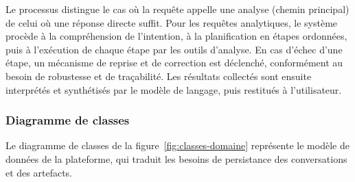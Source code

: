Le processus distingue le cas où la requête appelle une analyse (chemin principal) de celui où une réponse directe suffit. Pour les requêtes analytiques, le système procède à la compréhension de l'intention, à la planification en étapes ordonnées, puis à l'exécution de chaque étape par les outils d'analyse. En cas d'échec d'une étape, un mécanisme de reprise et de correction est déclenché, conformément au besoin de robustesse et de traçabilité. Les résultats collectés sont ensuite interprétés et synthétisés par le modèle de langage, puis restitués à l'utilisateur.

\subsubsection{Diagramme de classes}

Le diagramme de classes de la figure~\ref{fig:classes-domaine} représente le modèle de données de la plateforme, qui traduit les besoins de persistance des conversations et des artefacts.

